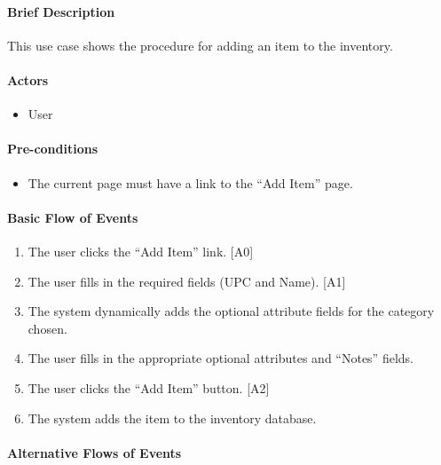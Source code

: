\documentclass{article}
\begin{document}
\paragraph{Brief Description}
This use case shows the procedure for adding an item to the inventory.

\paragraph{Actors}
\begin{itemize}
\item User
\end{itemize}

\paragraph{Pre-conditions}
\begin{itemize}
\item The current page must have a link to the ``Add Item'' page.
\end{itemize}

\paragraph{Basic Flow of Events}
\begin{enumerate}
\item The user clicks the ``Add Item'' link. [A0]
\item The user fills in the required fields (UPC and Name). [A1]
\item The system dynamically adds the optional attribute fields for the category chosen.
\item The user fills in the appropriate optional attributes and ``Notes'' fields.
\item The user clicks the ``Add Item'' button. [A2]
\item The system adds the item to the inventory database.
\end{enumerate}

\paragraph{Alternative Flows of Events}
\end{document}
